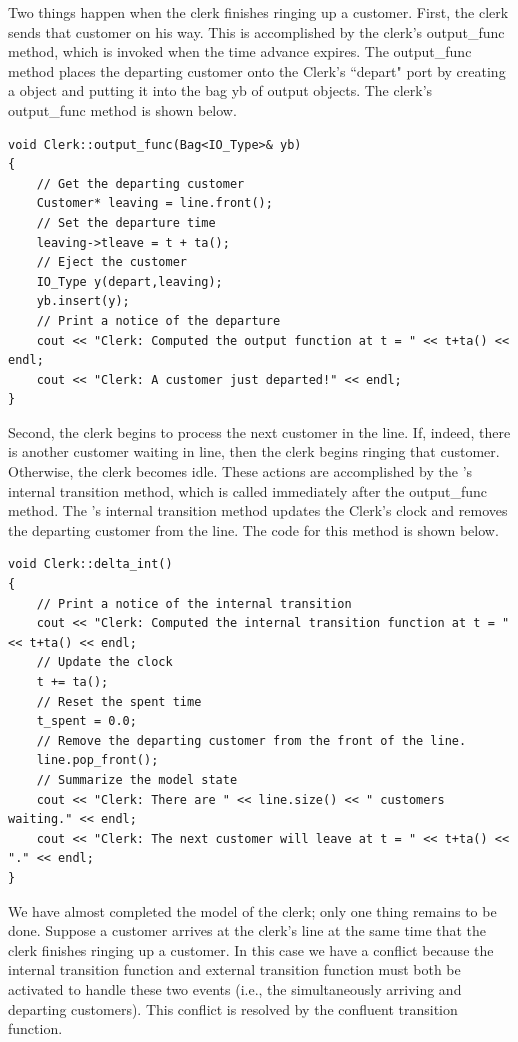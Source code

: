 Two things happen when the clerk finishes ringing up a customer. First, the clerk sends that customer on his way. This is accomplished by the clerk's output\_func method, which is invoked when the time advance expires. The output\_func method places the departing customer onto the Clerk's ``depart" port by creating a  object and putting it into the bag yb of output objects. The clerk's output\_func method is shown below.
\begin{verbatim}
void Clerk::output_func(Bag<IO_Type>& yb)
{
    // Get the departing customer
    Customer* leaving = line.front();
    // Set the departure time
    leaving->tleave = t + ta();
    // Eject the customer 
    IO_Type y(depart,leaving);
    yb.insert(y);
    // Print a notice of the departure
    cout << "Clerk: Computed the output function at t = " << t+ta() << endl;
    cout << "Clerk: A customer just departed!" << endl;
}
\end{verbatim}

Second, the clerk begins to process the next customer in the line. If, indeed, there is another customer waiting in line, then the clerk begins ringing that customer. Otherwise, the clerk becomes idle. These actions are accomplished by the 's internal transition method, which is called immediately after the output\_func method. The 's internal transition method updates the Clerk's clock and removes the departing customer from the line. The code for this method is shown below.
\begin{verbatim}
void Clerk::delta_int()
{
    // Print a notice of the internal transition
    cout << "Clerk: Computed the internal transition function at t = " << t+ta() << endl;
    // Update the clock
    t += ta();
    // Reset the spent time 
    t_spent = 0.0;
    // Remove the departing customer from the front of the line.
    line.pop_front();
    // Summarize the model state
    cout << "Clerk: There are " << line.size() << " customers waiting." << endl;
    cout << "Clerk: The next customer will leave at t = " << t+ta() << "." << endl;
}
\end{verbatim}

We have almost completed the model of the clerk; only one thing remains to be done. Suppose a customer arrives at the clerk's line at the same time that the clerk finishes ringing up a customer. In this case we have a conflict because the internal transition function and external transition function must both be activated to handle these two events (i.e., the simultaneously arriving and departing customers). This conflict is resolved by the confluent transition function.

